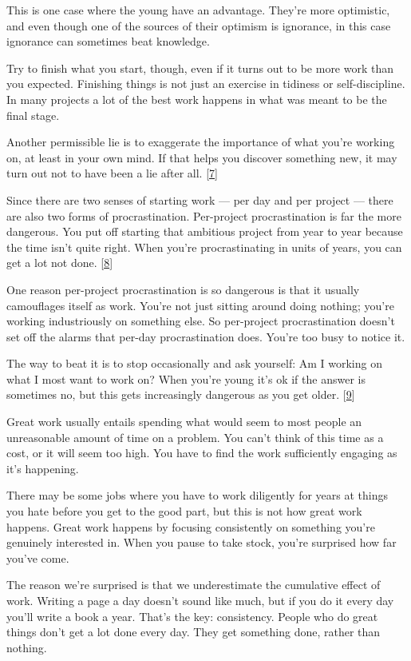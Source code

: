 This is one case where the young have an advantage. They're more
optimistic, and even though one of the sources of their optimism is
ignorance, in this case ignorance can sometimes beat knowledge.

Try to finish what you start, though, even if it turns out to be more
work than you expected. Finishing things is not just an exercise in
tidiness or self-discipline. In many projects a lot of the best work
happens in what was meant to be the final stage.

Another permissible lie is to exaggerate the importance of what you're
working on, at least in your own mind. If that helps you discover
something new, it may turn out not to have been a lie after all.
{[}\hyperref[f7n]{7}{]}

Since there are two senses of starting work --- per day and per project
--- there are also two forms of procrastination. Per-project
procrastination is far the more dangerous. You put off starting that
ambitious project from year to year because the time isn't quite right.
When you're procrastinating in units of years, you can get a lot not
done. {[}\hyperref[f8n]{8}{]}

One reason per-project procrastination is so dangerous is that it
usually camouflages itself as work. You're not just sitting around doing
nothing; you're working industriously on something else. So per-project
procrastination doesn't set off the alarms that per-day procrastination
does. You're too busy to notice it.

The way to beat it is to stop occasionally and ask yourself: Am I
working on what I most want to work on? When you're young it's ok if the
answer is sometimes no, but this gets increasingly dangerous as you get
older. {[}\hyperref[f9n]{9}{]}

Great work usually entails spending what would seem to most people an
unreasonable amount of time on a problem. You can't think of this time
as a cost, or it will seem too high. You have to find the work
sufficiently engaging as it's happening.

There may be some jobs where you have to work diligently for years at
things you hate before you get to the good part, but this is not how
great work happens. Great work happens by focusing consistently on
something you're genuinely interested in. When you pause to take stock,
you're surprised how far you've come.

The reason we're surprised is that we underestimate the cumulative
effect of work. Writing a page a day doesn't sound like much, but if you
do it every day you'll write a book a year. That's the key: consistency.
People who do great things don't get a lot done every day. They get
something done, rather than nothing.

